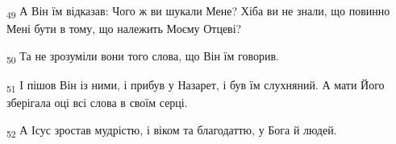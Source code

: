 \begin{tcolorbox}
\textsubscript{49} А Він їм відказав: Чого ж ви шукали Мене? Хіба ви не знали, що повинно Мені бути в тому, що належить Моєму Отцеві?
\end{tcolorbox}
\begin{tcolorbox}
\textsubscript{50} Та не зрозуміли вони того слова, що Він їм говорив.
\end{tcolorbox}
\begin{tcolorbox}
\textsubscript{51} І пішов Він із ними, і прибув у Назарет, і був їм слухняний. А мати Його зберігала оці всі слова в своїм серці.
\end{tcolorbox}
\begin{tcolorbox}
\textsubscript{52} А Ісус зростав мудрістю, і віком та благодаттю, у Бога й людей.
\end{tcolorbox}
